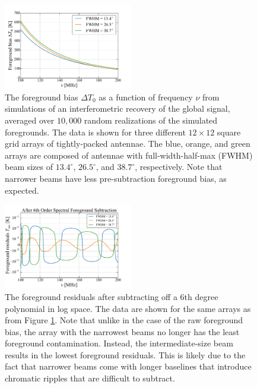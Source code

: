 \documentclass[twolcolumn,apj,iop,numberedappendix]{emulateapj}
\begin{document}
\begin{figure}[h]
	\centering
	\includegraphics[width=0.50\textwidth]{figures/unsub_T0_beamSize.pdf}
	\caption{The foreground bias $\Delta T_0$ as a function of frequency $\nu$ from simulations of an interferometric recovery of the global signal, averaged over $10,000$ random realizations of the simulated foregrounds. The data is shown for three different $12\times12$ square grid arrays of tightly-packed antennae. The blue, orange, and green arrays are composed of antennae with full-width-half-max (FWHM) beam sizes of $13.4^\circ$, $26.5^\circ$, and $38.7^\circ$, respectively. Note that narrower beams have less pre-subtraction foreground bias, as expected.}
	\label{fig:unsub_T0_beamSize}
\end{figure}

\begin{figure}[h]
	\centering
	\includegraphics[width=0.50\textwidth]{figures/subPoly6_T0_beamSize.pdf}
	\caption{The foreground residuals after subtracting off a $6$th degree polynomial in log space. The data are shown for the same arrays as from Figure \ref{fig:unsub_T0_beamSize}. Note that unlike in the case of the raw foreground bias, the array with the narrowest beams no longer has the least foreground contamination. Instead, the intermediate-size beam results in the lowest foreground residuals. This is likely due to the fact that narrower beams come with longer baselines that introduce chromatic ripples that are difficult to subtract.}
	\label{fig:subPoly6_T0_beamSize}
\end{figure}
\end{document}
